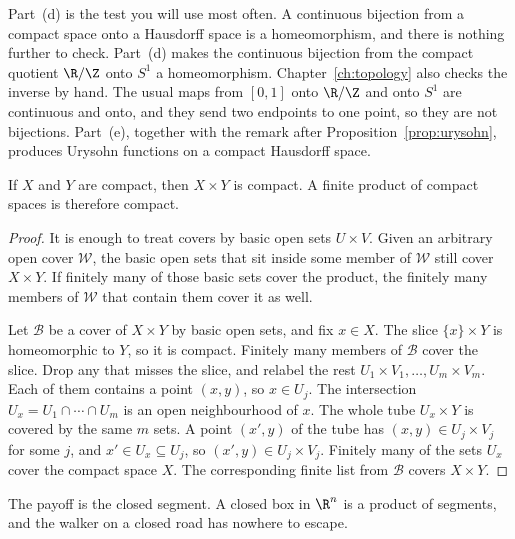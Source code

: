 Part~(d) is the test you will use most often. A continuous bijection from a compact space onto a Hausdorff space is a homeomorphism, and there is nothing further to check. Part~(d) makes the continuous bijection from the compact quotient $\R/\Z$ onto $S^1$ a homeomorphism. Chapter~\ref{ch:topology} also checks the inverse by hand. The usual maps from $[0,1]$ onto $\R/\Z$ and onto $S^1$ are continuous and onto, and they send two endpoints to one point, so they are not bijections. Part~(e), together with the remark after Proposition~\ref{prop:urysohn}, produces Urysohn functions on a compact Hausdorff space.

\begin{proposition}\label{prop:finiteproduct}
If $X$ and $Y$ are compact, then $X\times Y$ is compact. A finite product of compact spaces is therefore compact.
\end{proposition}
\begin{proof}
It is enough to treat covers by basic open sets $U\times V$. Given an arbitrary open cover $\mathcal W$, the basic open sets that sit inside some member of $\mathcal W$ still cover $X\times Y$. If finitely many of those basic sets cover the product, the finitely many members of $\mathcal W$ that contain them cover it as well.

Let $\mathcal B$ be a cover of $X\times Y$ by basic open sets, and fix $x\in X$. The slice $\{x\}\times Y$ is homeomorphic to $Y$, so it is compact. Finitely many members of $\mathcal B$ cover the slice. Drop any that misses the slice, and relabel the rest $U_1\times V_1,\dots,U_m\times V_m$. Each of them contains a point $(x,y)$, so $x\in U_j$. The intersection $U_x=U_1\cap\cdots\cap U_m$ is an open neighbourhood of $x$. The whole tube $U_x\times Y$ is covered by the same $m$ sets. A point $(x',y)$ of the tube has $(x,y)\in U_j\times V_j$ for some $j$, and $x'\in U_x\subseteq U_j$, so $(x',y)\in U_j\times V_j$. Finitely many of the sets $U_x$ cover the compact space $X$. The corresponding finite list from $\mathcal B$ covers $X\times Y$.
\end{proof}

The payoff is the closed segment. A closed box in $\R^n$ is a product of segments, and the walker on a closed road has nowhere to escape.

